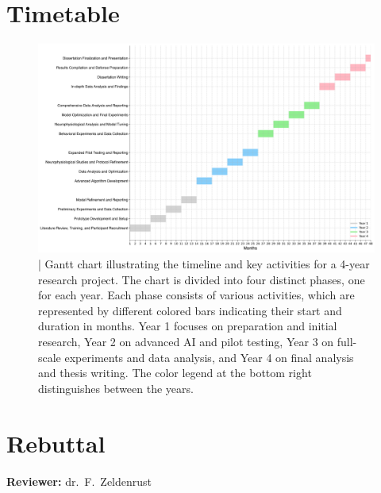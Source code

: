 \documentclass[10pt]{article}
\begin{document}
\section*{Timetable}\label{sec:timetable}
\begin{figure}[ht!]
  \centering
  \includegraphics[width=1.0\textwidth]{imgs/Gannt_chart.png}
  \caption{| Gantt chart illustrating the timeline and key activities for a 4-year research project. The chart is divided into four distinct phases, one for each year. Each phase consists of various activities, which are represented by different colored bars indicating their start and duration in months. Year 1 focuses on preparation and initial research, Year 2 on advanced AI and pilot testing, Year 3 on full-scale experiments and data analysis, and Year 4 on final analysis and thesis writing. The color legend at the bottom right distinguishes between the years.}\label{fig:gannt_chart}
\end{figure}

\printbibliography%

\section*{Rebuttal}\label{sec:rebuttal}
\noindent \textbf{Reviewer:} dr.\ F.\ Zeldenrust\\

\end{document}

